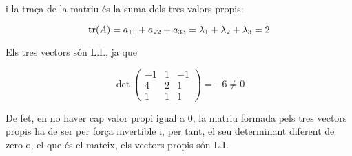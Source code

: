 i la traça de la matriu és la suma dels tres valors propis:

\[\tr(A)=a_{11}+a_{22}+a_{33}=\lambda_1+\lambda_2+\lambda_3=2\]

Els tres vectors són L.I., ja que 

\[\det \begin{pmatrix}-1&1&-1\\4&2&1\\1&1&1\end{pmatrix}=-6\neq 0\]

De fet, en no haver cap valor propi igual a $0$, la matriu formada pels tres vectors propis ha de ser per força invertible i, per tant, el seu determinant diferent de zero o, el que és el mateix, els vectors propis són L.I.

\blacksquare
